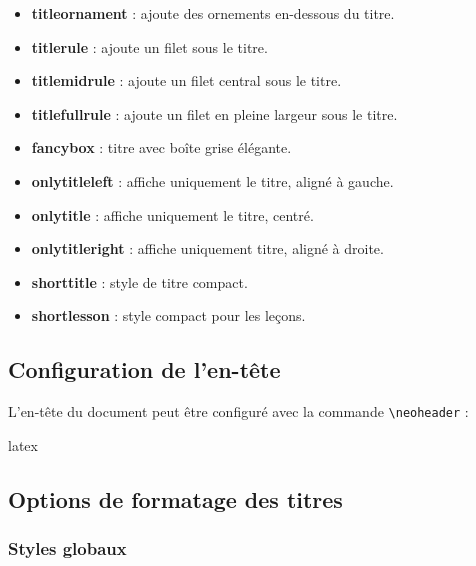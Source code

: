 \documentclass[
    french,
    margin=2cm
]{neoschool}
\begin{document}
\begin{itemize}
\item \textbf{titleornament} : ajoute des ornements en-dessous du titre.
\item \textbf{titlerule} : ajoute un filet sous le titre.
\item \textbf{titlemidrule} : ajoute un filet central sous le titre.
\item \textbf{titlefullrule} : ajoute un filet en pleine largeur sous le titre.
\item \textbf{fancybox} : titre avec boîte grise élégante.
\item \textbf{onlytitleleft} : affiche uniquement le titre, aligné à gauche.
\item \textbf{onlytitle} : affiche uniquement le titre, centré.
\item \textbf{onlytitleright} : affiche uniquement titre, aligné à droite.
\item \textbf{shorttitle} : style de titre compact.
\item \textbf{shortlesson} : style compact pour les leçons.
\end{itemize}

\subsection{Configuration de l'en-tête}

L'en-tête du document peut être configuré avec la commande
\texttt{\textbackslash neoheader} :

\begin{code}{latex}
\end{code}

\subsection{Options de formatage des titres}

\subsubsection{Styles globaux}
\end{document}

